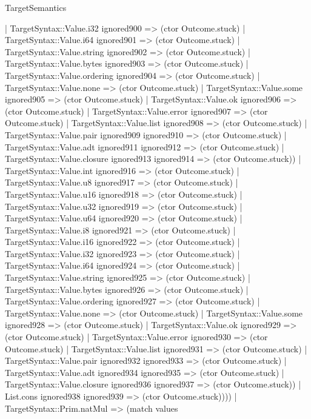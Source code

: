 \begin{lexlean}{TargetSemantics}
\begin{semanticmodule}
{              | TargetSyntax::Value.i32 ignored900 => (ctor Outcome.stuck)
              | TargetSyntax::Value.i64 ignored901 => (ctor Outcome.stuck)
              | TargetSyntax::Value.string ignored902 => (ctor Outcome.stuck)
              | TargetSyntax::Value.bytes ignored903 => (ctor Outcome.stuck)
              | TargetSyntax::Value.ordering ignored904 => (ctor Outcome.stuck)
              | TargetSyntax::Value.none => (ctor Outcome.stuck)
              | TargetSyntax::Value.some ignored905 => (ctor Outcome.stuck)
              | TargetSyntax::Value.ok ignored906 => (ctor Outcome.stuck)
              | TargetSyntax::Value.error ignored907 => (ctor Outcome.stuck)
              | TargetSyntax::Value.list ignored908 => (ctor Outcome.stuck)
              | TargetSyntax::Value.pair ignored909 ignored910 => (ctor Outcome.stuck)
              | TargetSyntax::Value.adt ignored911 ignored912 => (ctor Outcome.stuck)
              | TargetSyntax::Value.closure ignored913 ignored914 => (ctor Outcome.stuck))
            | TargetSyntax::Value.int ignored916 => (ctor Outcome.stuck)
            | TargetSyntax::Value.u8 ignored917 => (ctor Outcome.stuck)
            | TargetSyntax::Value.u16 ignored918 => (ctor Outcome.stuck)
            | TargetSyntax::Value.u32 ignored919 => (ctor Outcome.stuck)
            | TargetSyntax::Value.u64 ignored920 => (ctor Outcome.stuck)
            | TargetSyntax::Value.i8 ignored921 => (ctor Outcome.stuck)
            | TargetSyntax::Value.i16 ignored922 => (ctor Outcome.stuck)
            | TargetSyntax::Value.i32 ignored923 => (ctor Outcome.stuck)
            | TargetSyntax::Value.i64 ignored924 => (ctor Outcome.stuck)
            | TargetSyntax::Value.string ignored925 => (ctor Outcome.stuck)
            | TargetSyntax::Value.bytes ignored926 => (ctor Outcome.stuck)
            | TargetSyntax::Value.ordering ignored927 => (ctor Outcome.stuck)
            | TargetSyntax::Value.none => (ctor Outcome.stuck)
            | TargetSyntax::Value.some ignored928 => (ctor Outcome.stuck)
            | TargetSyntax::Value.ok ignored929 => (ctor Outcome.stuck)
            | TargetSyntax::Value.error ignored930 => (ctor Outcome.stuck)
            | TargetSyntax::Value.list ignored931 => (ctor Outcome.stuck)
            | TargetSyntax::Value.pair ignored932 ignored933 => (ctor Outcome.stuck)
            | TargetSyntax::Value.adt ignored934 ignored935 => (ctor Outcome.stuck)
            | TargetSyntax::Value.closure ignored936 ignored937 => (ctor Outcome.stuck))
          | List.cons ignored938 ignored939 => (ctor Outcome.stuck))))
    | TargetSyntax::Prim.natMul => (match values
}
\end{semanticmodule}
\end{lexlean}
